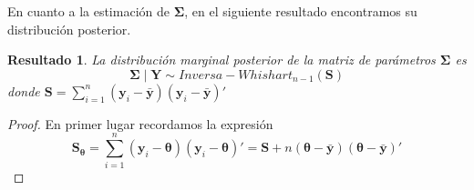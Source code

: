 \documentclass[
  10pt,
  spanish,
]{book}
\newtheorem{proposition}{Resultado}[chapter]
\theoremstyle{definition}
\theoremstyle{definition}
\theoremstyle{definition}
\theoremstyle{definition}
\theoremstyle{remark}
\begin{document}
En cuanto a la estimación de \(\boldsymbol \Sigma\), en el siguiente resultado encontramos su distribución posterior.

\begin{proposition}
\protect\hypertarget{prp:unnamed-chunk-56}{}{\label{prp:unnamed-chunk-56} }La distribución marginal posterior de la matriz de parámetros \(\boldsymbol \Sigma\) es
\begin{equation*}
\boldsymbol \Sigma\mid \mathbf{Y}\sim Inversa-Whishart_{n-1}(\mathbf{S})
\end{equation*}
donde \(\mathbf{S}=\sum_{i=1}^n(\mathbf{y}_i-\bar{\mathbf{y}})(\mathbf{y}_i-\bar{\mathbf{y}})'\)
\end{proposition}

\begin{proof}
{}En primer lugar recordamos la expresión
\begin{equation*}
\textbf{S}_{\boldsymbol \theta}=\sum_{i=1}^n(\mathbf{y}_i-\boldsymbol \theta)(\mathbf{y}_i-\boldsymbol \theta)'=\mathbf{S}+n(\boldsymbol \theta-\bar{\mathbf{y}})(\boldsymbol \theta-\bar{\mathbf{y}})'
\end{equation*}


\end{proof}
\end{document}
